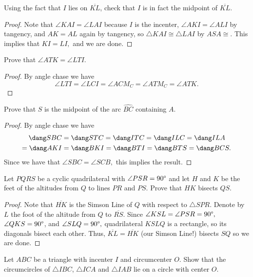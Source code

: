 \documentclass[letterpaper,oneside]{scrartcl}
\providecommand{\ol}{\overline}
\begin{document}
\begin{problem*}
  Using the fact that \(I\) lies on \(\ol{KL}\), check that \(I\) is in fact the midpoint of \(\ol{KL}\). 
\end{problem*}
\begin{proof}
  Note that \(\angle KAI = \angle LAI\) because $I$ is the incenter, \(\angle AKI = \angle ALI\) by tangency, and \(AK = AL\) again by tangency, so \(\triangle KAI \cong \triangle LAI\) by \(ASA\cong\). This implies that \(KI = LI,\) and we are done.
\end{proof}
\begin{problem*}
  Prove that \(\angle ATK = \angle LTI\).
\end{problem*}
\begin{proof}
  By angle chase we have
  \[\angle LTI = \angle LCI = \angle ACM_C = \angle ATM_C = \angle ATK.\]
\end{proof}
\begin{problem*}
  Prove that $S$ is the midpoint of the arc \(\widehat{BC}\) containing $A$.
\end{problem*}
\begin{proof}
  By angle chase we have
  \begin{align*}
  \dang SBC &= \dang STC = \dang ITC = \dang ILC = \dang ILA \\
  = \dang AKI &= \dang BKI = \dang BTI = \dang BTS = \dang BCS.
  \end{align*}
  Since we have that \(\angle SBC = \angle SCB,\) this implies the result.
\end{proof}
\begin{problem*}
  Let $PQRS$ be a cyclic quadrilateral with $ \angle PSR = 90\degree$ and let $H$ and $K$ be the feet of the altitudes from $Q$ to lines $PR$ and $PS$. Prove that $HK$ bisects $QS$.
\end{problem*}
\begin{proof}
  Note that \(\ol{HK}\) is the Simson Line of \(Q\) with respect to \(\triangle SPR\). Denote by \(L\) the foot of the altitude from \(Q\) to \(\ol{RS}\). Since \(\angle KSL = \angle PSR = 90\degree,\) \(\angle QKS = 90\degree\), and \(\angle SLQ = 90\degree,\) quadrilateral \(KSLQ\) is a rectangle, so its diagonals bisect each other. Thus, \(\ol{KL} = \ol{HK}\) (our Simson Line!) bisects \(SQ\) so we are done.
\end{proof}
\begin{problem*}
  [4.42, USAMO 1988/4]
  Let $ABC$ be a triangle with incenter $I$ and circumcenter $O$. Show that the circumcircles of $\triangle IBC$, $\triangle ICA$ and $\triangle IAB$ lie on a circle with center $O$.
\end{problem*}
\end{document}

